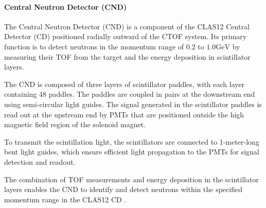 \paragraph{Central Neutron Detector (CND)}
    The Central Neutron Detector (CND) is a component of the CLAS12 Central Detector (CD) positioned radially outward of the CTOF system.
    Its primary function is to detect neutrons in the momentum range of $0.2$ to $1.0 \text{GeV}$ by measuring their TOF from the target and the energy deposition in scintillator layers.

    The CND is composed of three layers of scintillator paddles, with each layer containing 48 paddles.
    The paddles are coupled in pairs at the downstream end using semi-circular light guides.
    The signal generated in the scintillator paddles is read out at the upstream end by PMTs that are positioned outside the high magnetic field region of the solenoid magnet.

    To transmit the scintillation light, the scintillators are connected to 1-meter-long bent light guides, which ensure efficient light propagation to the PMTs for signal detection and readout.

    The combination of TOF measurements and energy deposition in the scintillator layers enables the CND to identify and detect neutrons within the specified momentum range in the CLAS12 CD \cite{chatagnon2020}.
